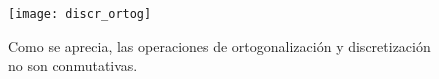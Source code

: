 \newpage %

\begin{figure}[H]
\centering\captionsetup{format = hang}
	\begin{measuredfigure}
		\label{fig: ortogonalizacion, discretizacion}
		\texttt{[image: discr\_ortog]} 
		\caption{Como se aprecia, las operaciones de
		ortogonalización y discretización no son conmutativas.}
 	\end{measuredfigure}
 \end{figure}